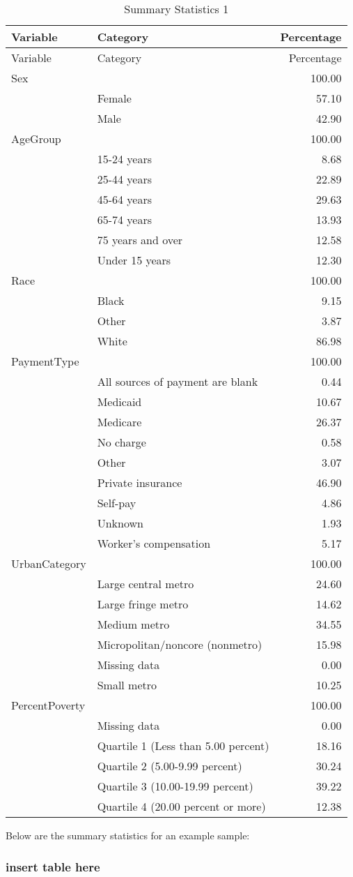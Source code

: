 \documentclass[12pt,twoside]{reedthesis}
\begin{document}
  \newpage
  
  \singlespacing
  
  \begin{longtable}[c]{@{}llr@{}}
  \caption{Summary Statistics 1 \label{tab:sums}}\tabularnewline
  \toprule
  Variable & Category & Percentage\tabularnewline
  \midrule
  \endfirsthead
  \toprule
  Variable & Category & Percentage\tabularnewline
  \midrule
  \endhead
  Sex & & 100.00\tabularnewline
  & Female & 57.10\tabularnewline
  & Male & 42.90\tabularnewline
  AgeGroup & & 100.00\tabularnewline
  & 15-24 years & 8.68\tabularnewline
  & 25-44 years & 22.89\tabularnewline
  & 45-64 years & 29.63\tabularnewline
  & 65-74 years & 13.93\tabularnewline
  & 75 years and over & 12.58\tabularnewline
  & Under 15 years & 12.30\tabularnewline
  Race & & 100.00\tabularnewline
  & Black & 9.15\tabularnewline
  & Other & 3.87\tabularnewline
  & White & 86.98\tabularnewline
  PaymentType & & 100.00\tabularnewline
  & All sources of payment are blank & 0.44\tabularnewline
  & Medicaid & 10.67\tabularnewline
  & Medicare & 26.37\tabularnewline
  & No charge & 0.58\tabularnewline
  & Other & 3.07\tabularnewline
  & Private insurance & 46.90\tabularnewline
  & Self-pay & 4.86\tabularnewline
  & Unknown & 1.93\tabularnewline
  & Worker's compensation & 5.17\tabularnewline
  UrbanCategory & & 100.00\tabularnewline
  & Large central metro & 24.60\tabularnewline
  & Large fringe metro & 14.62\tabularnewline
  & Medium metro & 34.55\tabularnewline
  & Micropolitan/noncore (nonmetro) & 15.98\tabularnewline
  & Missing data & 0.00\tabularnewline
  & Small metro & 10.25\tabularnewline
  PercentPoverty & & 100.00\tabularnewline
  & Missing data & 0.00\tabularnewline
  & Quartile 1 (Less than 5.00 percent) & 18.16\tabularnewline
  & Quartile 2 (5.00-9.99 percent) & 30.24\tabularnewline
  & Quartile 3 (10.00-19.99 percent) & 39.22\tabularnewline
  & Quartile 4 (20.00 percent or more) & 12.38\tabularnewline
  \bottomrule
  \end{longtable}
  
  \doublespacing
  Below are the summary statistics for an example sample:
  
  \begin{Shaded}
  \begin{Highlighting}[]
  \end{Highlighting}
  \end{Shaded}
  
  \subsubsection{insert table here}\label{insert-table-here}
  
\end{document}
